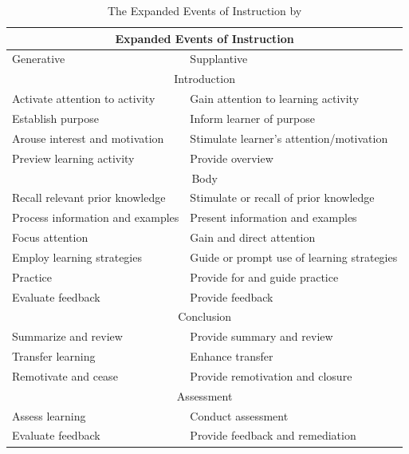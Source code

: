 \documentclass[11pt,twoside]{report} %
\begin{document}
\begin{table}[htbp]
\begin{center}
\begin{tabular}{|p{}|p{}|}
\hline
\multicolumn{ 2}{|c|}{\textbf{Expanded Events of Instruction}} \\ \hline
Generative & Supplantive \\ \hline
\multicolumn{ 2}{|c|}{Introduction} \\ \hline
Activate attention to activity & Gain attention to learning activity \\ \hline
Establish purpose & Inform learner of purpose \\ \hline
Arouse interest and motivation & Stimulate learner's attention/motivation \\ \hline
Preview learning activity & Provide overview \\ \hline
\multicolumn{ 2}{|c|}{Body} \\ \hline
Recall relevant prior knowledge & Stimulate or recall of prior knowledge \\ \hline
Process information and examples & Present information and examples \\ \hline
Focus attention & Gain and direct attention \\ \hline
Employ learning strategies & Guide or prompt use of learning strategies \\ \hline
Practice & Provide for and guide practice \\ \hline
Evaluate feedback & Provide feedback \\ \hline
\multicolumn{ 2}{|c|}{Conclusion} \\ \hline
Summarize and review & Provide summary and review \\ \hline
Transfer learning & Enhance transfer \\ \hline
Remotivate and cease & Provide remotivation and closure \\ \hline
\multicolumn{ 2}{|c|}{Assessment} \\ \hline
Assess learning & Conduct assessment \\ \hline
Evaluate feedback & Provide feedback and remediation \\ \hline
\end{tabular}
\end{center}
\caption{The Expanded Events of Instruction by \protect\cite{smithragan}}
\label{tab:eventsinstruction}
\end{table}
\end{document}
